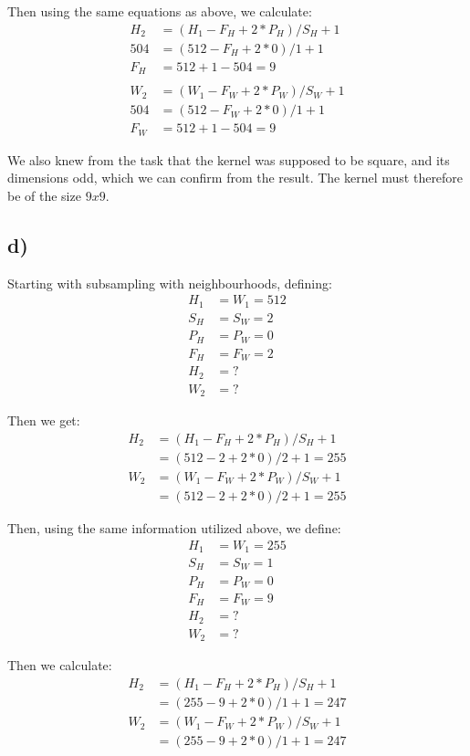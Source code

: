 Then using the same equations as above, we calculate: 
\begin{align*}
    H_2 &= (H_1 - F_H + 2 * P_H) / S_H + 1 \\
    504 &= (512 - F_H + 2 * 0) / 1 + 1 \\
    F_H &= 512 + 1 - 504 = 9 \\ \\
    W_2 &= (W_1 - F_W + 2 * P_W) / S_W + 1 \\
    504 &= (512 - F_W + 2 * 0) / 1 + 1 \\
    F_W &= 512 + 1 - 504 = 9
\end{align*}

We also knew from the task that the kernel was supposed to be square, and its dimensions odd, which we can confirm from the result. The kernel must therefore be of the size $9 x 9$. 

\subsection*{d)}
Starting with subsampling with neighbourhoods, defining: 
\begin{align*}
    H_1 &= W_1 = 512 \\
    S_H &= S_W = 2 \\
    P_H &= P_W = 0 \\
    F_H &= F_W = 2 \\
    H_2 &= ? \\
    W_2 &= ?
\end{align*}

Then we get: 
\begin{align*}
    H_2 &= (H_1 - F_H + 2 * P_H) / S_H + 1 \\
    &= (512 - 2 + 2 * 0) / 2 + 1 = 255 \\
    W_2 &= (W_1 - F_W + 2 * P_W) / S_W + 1 \\
    &= (512 - 2 + 2 * 0) / 2 + 1 = 255
\end{align*}

Then, using the same information utilized above, we define: 
\begin{align*}
    H_1 &= W_1 = 255 \\
    S_H &= S_W = 1 \\
    P_H &= P_W = 0 \\
    F_H &= F_W = 9 \\
    H_2 &= ? \\
    W_2 &= ?
\end{align*}

Then we calculate: 
\begin{align*}
    H_2 &= (H_1 - F_H + 2 * P_H) / S_H + 1 \\
    &= (255 - 9 + 2 * 0) / 1 + 1 = 247 \\
    W_2 &= (W_1 - F_W + 2 * P_W) / S_W + 1 \\
    &= (255 - 9 + 2 * 0) / 1 + 1 = 247
\end{align*}

